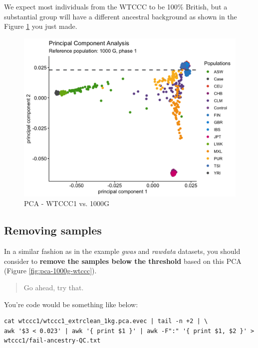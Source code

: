 \documentclass[
]{book}
\begin{document}
We expect most individuals from the WTCCC to be 100\% British, but a substantial group will have a different ancestral background as shown in the Figure \ref{fig:show-wtccc1-pca} you just made.

\begin{figure}

{\centering \includegraphics[width=18.67in]{img/_gwas/WTCCC1-pca-1000g} 

}

\caption{PCA - WTCCC1 vs. 1000G}\label{fig:show-wtccc1-pca}
\end{figure}

\hypertarget{removing-samples-1}{%
\subsection{Removing samples}\label{removing-samples-1}}

In a similar fashion as in the example \emph{gwas} and \emph{rawdata} datasets, you should consider to \textbf{remove the samples below the threshold} based on this PCA (Figure \ref{fig:pca-1000g-wtccc}).

\begin{quote}
Go ahead, try that.
\end{quote}

You're code would be something like below:

\begin{verbatim}
cat wtccc1/wtccc1_extrclean_1kg.pca.evec | tail -n +2 | \
awk '$3 < 0.023' | awk '{ print $1 }' | awk -F":" '{ print $1, $2 }' > wtccc1/fail-ancestry-QC.txt
\end{verbatim}
\end{document}
